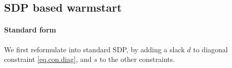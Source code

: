 \documentclass[../main]{subfiles}
\begin{document}




\subsection{SDP based warmstart}

\paragraph{Standard form}
We first reformulate into standard SDP, by adding a slack \(d\) to diagonal constraint \eqref{eq.con.diag}, and \(s\) to the other constraints.
\end{document}
